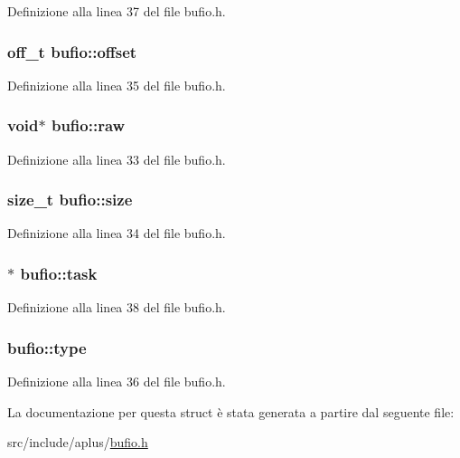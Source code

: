 Definizione alla linea 37 del file bufio.\+h.

\hypertarget{structbufio_a0f3f80e49eba1806c7468d2283083ea0}{
\subsubsection[{offset}]{\setlength{\rightskip}{0pt plus 5cm}off\+\_\+t bufio\+::offset}}\label{structbufio_a0f3f80e49eba1806c7468d2283083ea0}


Definizione alla linea 35 del file bufio.\+h.

\hypertarget{structbufio_a7d5a293fbae342f7f9da0390aa04d74a}{
\subsubsection[{raw}]{\setlength{\rightskip}{0pt plus 5cm}void$\ast$ bufio\+::raw}}\label{structbufio_a7d5a293fbae342f7f9da0390aa04d74a}


Definizione alla linea 33 del file bufio.\+h.

\hypertarget{structbufio_a233f5f8090a3f39d9471333db439e2bb}{
\subsubsection[{size}]{\setlength{\rightskip}{0pt plus 5cm}size\+\_\+t bufio\+::size}}\label{structbufio_a233f5f8090a3f39d9471333db439e2bb}


Definizione alla linea 34 del file bufio.\+h.

\hypertarget{structbufio_a27683bf934579d5f42529dcea191db50}{
\subsubsection[{task}]{$\ast$ bufio\+::task}}\label{structbufio_a27683bf934579d5f42529dcea191db50}


Definizione alla linea 38 del file bufio.\+h.

\hypertarget{structbufio_ad5542b6d1da521611e9d5790a4a9e651}{
\subsubsection[{type}]{ bufio\+::type}}\label{structbufio_ad5542b6d1da521611e9d5790a4a9e651}


Definizione alla linea 36 del file bufio.\+h.



La documentazione per questa struct è stata generata a partire dal seguente file\+:\begin{DoxyCompactItemize}
\item 
src/include/aplus/\hyperlink{bufio_8h}{bufio.\+h}\end{DoxyCompactItemize}
